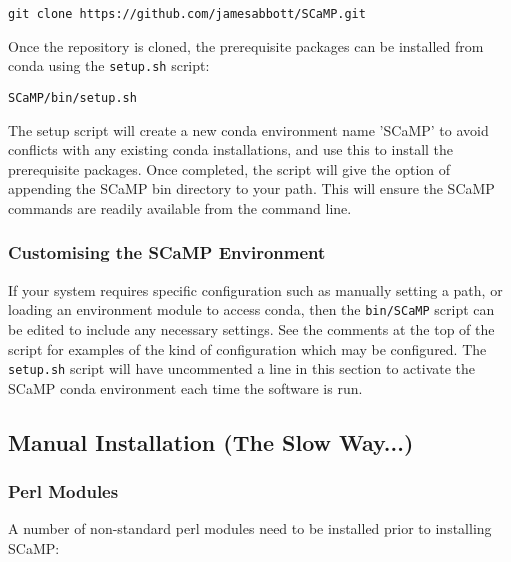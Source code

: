 \documentclass[a4paper,10pt]{article}
\begin{document}
{\tt git clone https://github.com/jamesabbott/SCaMP.git}

Once the repository is cloned, the prerequisite packages can be installed from
conda using the {\tt setup.sh} script:           

{\tt SCaMP/bin/setup.sh}

The setup script will create a new conda environment name 'SCaMP' to avoid
conflicts with any existing conda installations, and use this to install
the prerequisite packages. Once completed, the script will give the option of
appending the SCaMP bin directory to your path. This will ensure the SCaMP
commands are readily available from the command line.

\subsubsection{Customising the SCaMP Environment}

If your system requires specific configuration such as manually setting a path,
or loading an environment module to access conda, then the {\tt bin/SCaMP}
script can be edited to include any necessary settings. See the comments at the
top of the script for examples of the kind of configuration which may be
configured. The {\tt setup.sh} script will have uncommented a line in this
section to activate the SCaMP conda environment each time the software is run.

\subsection{Manual Installation (The Slow Way...)}

\subsubsection{Perl Modules}

A number of non-standard perl modules need to be installed prior to installing SCaMP: 
\end{document}
